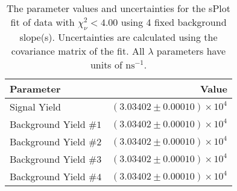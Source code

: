 
\begin{table}
    \begin{center}
        \begin{tabular}{lr}\toprule
            Parameter & Value \\\midrule
            Signal Yield & $(3.03402 \pm 0.00010) \times 10^{4}$ \\
            Background Yield $\#1$ & $(3.03402 \pm 0.00010) \times 10^{4}$ \\
            Background Yield $\#2$ & $(3.03402 \pm 0.00010) \times 10^{4}$ \\
            Background Yield $\#3$ & $(3.03402 \pm 0.00010) \times 10^{4}$ \\
            Background Yield $\#4$ & $(3.03402 \pm 0.00010) \times 10^{4}$ \\\bottomrule
        \end{tabular}
        \caption{The parameter values and uncertainties for the sPlot fit of data with $\chi^2_\nu < 4.00$ using 4 fixed background slope(s). Uncertainties are calculated using the covariance matrix of the fit. All $\lambda$ parameters have units of $\si{\nano\second}^{-1}$.}
    \end{center}
\end{table}
